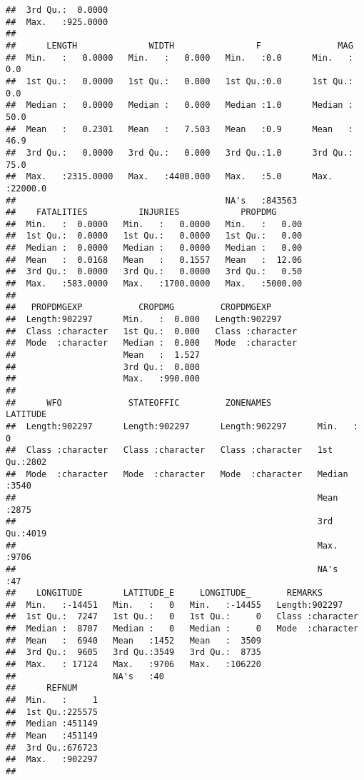 \documentclass[]{article}
\begin{document}
\begin{verbatim}
##  3rd Qu.:  0.0000                                        
##  Max.   :925.0000                                        
##                                                          
##      LENGTH              WIDTH                F               MAG         
##  Min.   :   0.0000   Min.   :   0.000   Min.   :0.0      Min.   :    0.0  
##  1st Qu.:   0.0000   1st Qu.:   0.000   1st Qu.:0.0      1st Qu.:    0.0  
##  Median :   0.0000   Median :   0.000   Median :1.0      Median :   50.0  
##  Mean   :   0.2301   Mean   :   7.503   Mean   :0.9      Mean   :   46.9  
##  3rd Qu.:   0.0000   3rd Qu.:   0.000   3rd Qu.:1.0      3rd Qu.:   75.0  
##  Max.   :2315.0000   Max.   :4400.000   Max.   :5.0      Max.   :22000.0  
##                                         NA's   :843563                    
##    FATALITIES          INJURIES            PROPDMG       
##  Min.   :  0.0000   Min.   :   0.0000   Min.   :   0.00  
##  1st Qu.:  0.0000   1st Qu.:   0.0000   1st Qu.:   0.00  
##  Median :  0.0000   Median :   0.0000   Median :   0.00  
##  Mean   :  0.0168   Mean   :   0.1557   Mean   :  12.06  
##  3rd Qu.:  0.0000   3rd Qu.:   0.0000   3rd Qu.:   0.50  
##  Max.   :583.0000   Max.   :1700.0000   Max.   :5000.00  
##                                                          
##   PROPDMGEXP           CROPDMG         CROPDMGEXP       
##  Length:902297      Min.   :  0.000   Length:902297     
##  Class :character   1st Qu.:  0.000   Class :character  
##  Mode  :character   Median :  0.000   Mode  :character  
##                     Mean   :  1.527                     
##                     3rd Qu.:  0.000                     
##                     Max.   :990.000                     
##                                                         
##      WFO             STATEOFFIC         ZONENAMES            LATITUDE   
##  Length:902297      Length:902297      Length:902297      Min.   :   0  
##  Class :character   Class :character   Class :character   1st Qu.:2802  
##  Mode  :character   Mode  :character   Mode  :character   Median :3540  
##                                                           Mean   :2875  
##                                                           3rd Qu.:4019  
##                                                           Max.   :9706  
##                                                           NA's   :47    
##    LONGITUDE        LATITUDE_E     LONGITUDE_       REMARKS         
##  Min.   :-14451   Min.   :   0   Min.   :-14455   Length:902297     
##  1st Qu.:  7247   1st Qu.:   0   1st Qu.:     0   Class :character  
##  Median :  8707   Median :   0   Median :     0   Mode  :character  
##  Mean   :  6940   Mean   :1452   Mean   :  3509                     
##  3rd Qu.:  9605   3rd Qu.:3549   3rd Qu.:  8735                     
##  Max.   : 17124   Max.   :9706   Max.   :106220                     
##                   NA's   :40                                        
##      REFNUM      
##  Min.   :     1  
##  1st Qu.:225575  
##  Median :451149  
##  Mean   :451149  
##  3rd Qu.:676723  
##  Max.   :902297  
## 
\end{verbatim}
\end{document}
